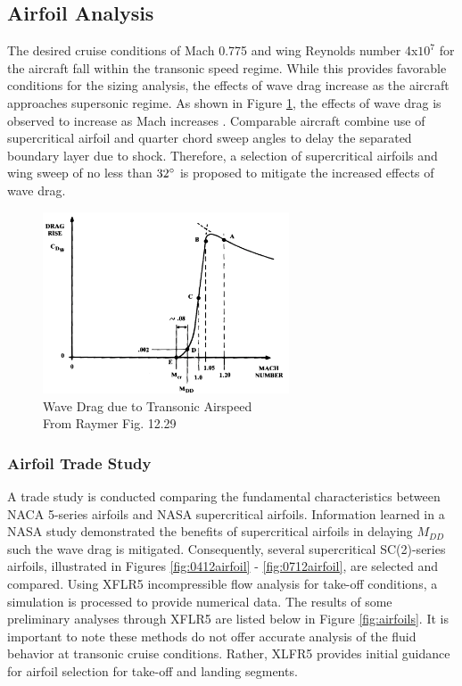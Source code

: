 \subsection{Airfoil Analysis}
The desired cruise conditions of Mach 0.775 and wing Reynolds number 4x$10^7$ for the aircraft fall within the transonic speed regime.  While this provides favorable conditions for the sizing analysis, the effects of wave drag increase as the aircraft approaches supersonic regime.  As shown in Figure \ref{fig:transonic}, the effects of wave drag is observed to increase as Mach increases \cite{raymer}.  Comparable aircraft combine use of supercritical airfoil and quarter chord sweep angles to delay the separated boundary layer due to shock.  Therefore, a selection of supercritical airfoils and wing sweep of no less than $32\degree$ is proposed to mitigate the increased effects of wave drag.

\begin{figure}[!h]
    \centering
    \includegraphics[width=0.65\textwidth]{Photos/wavedragduetotransonic.png}
    \caption{Wave Drag due to Transonic Airspeed\\{\small From Raymer Fig. 12.29}}
    \label{fig:transonic}
\end{figure}

\subsubsection{Airfoil Trade Study}
A trade study is conducted comparing the fundamental characteristics between NACA 5-series airfoils and NASA supercritical airfoils.  Information learned in a NASA study \cite{supercritical} demonstrated the benefits of supercritical airfoils in delaying $M_{DD}$ such the wave drag is mitigated.  Consequently, several supercritical SC(2)-series airfoils, illustrated in Figures \ref{fig:0412airfoil} - \ref{fig:0712airfoil}, are selected and compared.  Using XFLR5 \cite{xflr5} incompressible flow analysis for take-off conditions, a simulation is processed to provide numerical data.  The results of some preliminary analyses through XFLR5 are listed below in Figure \ref{fig:airfoils}.  It is important to note these methods do not offer accurate analysis of the fluid behavior at transonic cruise conditions.  Rather, XLFR5 provides initial guidance for airfoil selection for take-off and landing segments.

